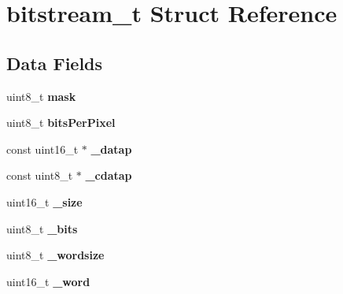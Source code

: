 \hypertarget{structbitstream__t}{\section{bitstream\-\_\-t Struct Reference}
\label{structbitstream__t}
}
\subsection*{Data Fields}
\begin{DoxyCompactItemize}
\item 
\hypertarget{structbitstream__t_a8a74907784be6c7786c2d060c8d7e10b}{uint8\-\_\-t {\bfseries mask}}\label{structbitstream__t_a8a74907784be6c7786c2d060c8d7e10b}

\item 
\hypertarget{structbitstream__t_a6a3c851ca52ea8aa201b6753a4585736}{uint8\-\_\-t {\bfseries bits\-Per\-Pixel}}\label{structbitstream__t_a6a3c851ca52ea8aa201b6753a4585736}

\item 
\hypertarget{structbitstream__t_abbe363f9656f8bb558bc126058015158}{const uint16\-\_\-t $\ast$ {\bfseries \-\_\-datap}}\label{structbitstream__t_abbe363f9656f8bb558bc126058015158}

\item 
\hypertarget{structbitstream__t_a6fa0b0c0df2bc324f2e6bdc034128700}{const uint8\-\_\-t $\ast$ {\bfseries \-\_\-cdatap}}\label{structbitstream__t_a6fa0b0c0df2bc324f2e6bdc034128700}

\item 
\hypertarget{structbitstream__t_aa634b952549ebb0aa1c5f90330b66f76}{uint16\-\_\-t {\bfseries \-\_\-size}}\label{structbitstream__t_aa634b952549ebb0aa1c5f90330b66f76}

\item 
\hypertarget{structbitstream__t_ac7b691cab37efadfad1f6f8739dfe125}{uint8\-\_\-t {\bfseries \-\_\-bits}}\label{structbitstream__t_ac7b691cab37efadfad1f6f8739dfe125}

\item 
\hypertarget{structbitstream__t_a1247e14eec68041248d6d71040b151a2}{uint8\-\_\-t {\bfseries \-\_\-wordsize}}\label{structbitstream__t_a1247e14eec68041248d6d71040b151a2}

\item 
\hypertarget{structbitstream__t_a957c357acebf129016c23a180c55a138}{uint16\-\_\-t {\bfseries \-\_\-word}}\label{structbitstream__t_a957c357acebf129016c23a180c55a138}


\end{DoxyCompactItemize}
